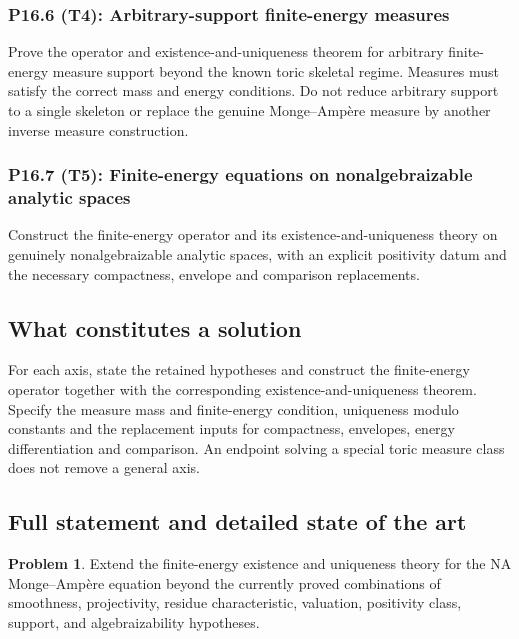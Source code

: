 \documentclass[11pt,a4paper]{article}
\theoremstyle{definition}
\newtheorem{problem}{Problem}[section]
\theoremstyle{remark}
\begin{document}
\subsubsection*{P16.6 (T4): Arbitrary-support finite-energy measures}
\label{atom:P16.6}
Prove the operator and existence-and-uniqueness theorem for arbitrary finite-energy measure support beyond the known toric skeletal regime. Measures must satisfy the correct mass and energy conditions. Do not reduce arbitrary support to a single skeleton or replace the genuine Monge--Ampère measure by another inverse measure construction.

\subsubsection*{P16.7 (T5): Finite-energy equations on nonalgebraizable analytic spaces}
\label{atom:P16.7}
Construct the finite-energy operator and its existence-and-uniqueness theory on genuinely nonalgebraizable analytic spaces, with an explicit positivity datum and the necessary compactness, envelope and comparison replacements.

\subsection{What constitutes a solution}
For each axis, state the retained hypotheses and construct the finite-energy operator together with the corresponding existence-and-uniqueness theorem. Specify the measure mass and finite-energy condition, uniqueness modulo constants and the replacement inputs for compactness, envelopes, energy differentiation and comparison. An endpoint solving a special toric measure class does not remove a general axis.

\subsection{Full statement and detailed state of the art}
\label{sec:ch72-general-ma}

\begin{problem}\label{prob:frontier-general-ma}
Extend the finite-energy existence and uniqueness theory for the NA
Monge--Ampère equation beyond the currently proved combinations of smoothness,
projectivity, residue characteristic, valuation, positivity class, support,
and algebraizability hypotheses.
\end{problem}
\end{document}
